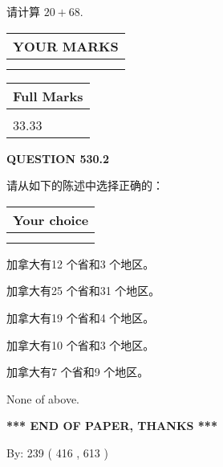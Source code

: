 \documentclass{ctexart}
\begin{document}
  
 
请计算 $ %
20 +  %
68 $.
 

 

 
  
\vspace{0.2in}
  
\noindent\begin{tabular}{|l|}
\hline
 YOUR MARKS  \\
\hline
 \\ 
 \\ 
\hline
\end{tabular}
\hspace{0.05in} \begin{tabular}{|l|}
\hline
 Full Marks  \\
\hline
 \\ 
33.33 \\
\hline
\end{tabular}
{\textbf{\Large{QUESTION
530.2 
}}}
  
  
请从如下的陈述中选择正确的：
  
  
\noindent\hspace{3.0in} \begin{tabular}{|l|}
\hline
Your choice \\
\hline
 \\ 
 \\ 
\hline
\end{tabular}
  
  
 
 
加拿大有12 个省和3 个地区。
 
 
加拿大有25 个省和31 个地区。
 
 
加拿大有19 个省和4 个地区。
 
 
加拿大有10 个省和3 个地区。
 
 
加拿大有7 个省和9 个地区。
 
 
 None of above.
 
 
   
   
 \vspace{0.2in}
 
   
   
   
   
\vspace{1.0in} 
{\textbf{\large{ *** END OF PAPER, THANKS *** }}} 
   
   
\hspace{1.0in} By: 
 239 ( 416 ,  613 )
   
\end{document}
